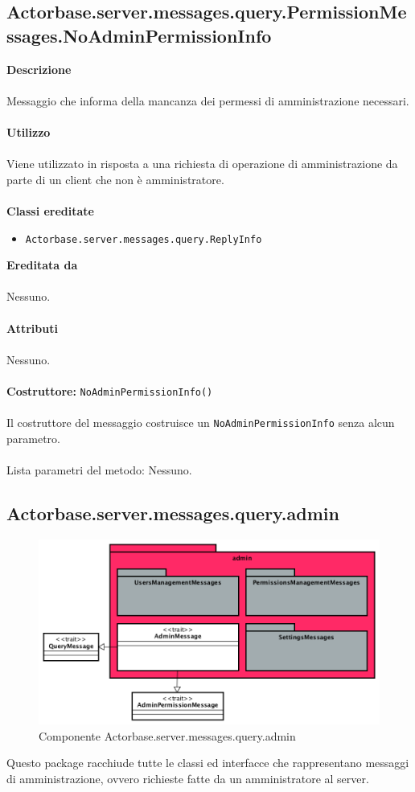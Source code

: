 \documentclass[a4paper]{article}
\begin{document}
\subsection{Actorbase.server.messages.query.PermissionMessages.NoAdminPermissionInfo}
		\textbf{Descrizione}
			\\ \\
			Messaggio che informa della mancanza dei permessi di amministrazione necessari.
			\\ \\
		\textbf{Utilizzo}
			\\ \\
			Viene utilizzato in risposta a una richiesta di operazione di amministrazione da parte di un client che non è amministratore.
			\\ \\
		\textbf{Classi ereditate}
			\begin{itemize}
				\item \texttt{Actorbase.server.messages.query.ReplyInfo}
			\end{itemize}
		\textbf{Ereditata da}
			\\ \\
			Nessuno.
			\\ \\
		\textbf{Attributi}
			\\ \\
			Nessuno.
			\\ \\
		\textbf{Costruttore: } \texttt{NoAdminPermissionInfo()}
			\\ \\
			Il costruttore del messaggio costruisce un \texttt{NoAdminPermissionInfo} senza alcun parametro.
			\\ \\
			Lista parametri del metodo: Nessuno.
			
		\subsection{Actorbase.server.messages.query.admin}
		\begin{figure}[H]
			\centering
			\includegraphics[width=\textwidth]{Server/adminLevel.png}
			\caption{Componente Actorbase.server.messages.query.admin}
		\end{figure}
		Questo package racchiude tutte le classi ed interfacce che rappresentano messaggi di amministrazione, ovvero richieste fatte da un amministratore al server.
		
\end{document}
